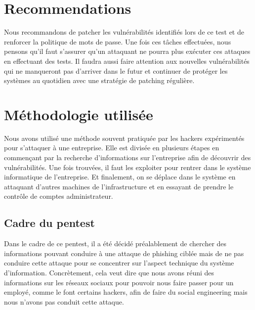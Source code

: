 \documentclass[french,oneside]{article}
\begin{document}
\section{Recommendations}

Nous recommandons de patcher les vulnérabilités identifiés lors de ce test et de renforcer la politique de mots de passe. Une fois ces tâches effectuées, nous pensons qu'il faut s'assurer qu'un attaquant ne pourra plus exécuter ces attaques en effectuant des tests. Il faudra aussi faire attention aux nouvelles vulnérabilités qui ne manqueront pas d'arriver dans le futur et continuer de protéger les systèmes au quotidien avec une stratégie de patching régulière.















\section{Méthodologie utilisée}

Nous avons utilisé une méthode souvent pratiquée par les hackers expérimentés pour s'attaquer à une entreprise. Elle est divisée en plusieurs étapes en commençant par la recherche d'informations sur l'entreprise afin de découvrir des vulnérabilités. Une fois trouvées, il faut les exploiter pour rentrer dans le système informatique de l'entreprise. Et finalement, on se déplace dans le système en attaquant d'autres machines de l'infrastructure et en essayant de prendre le contrôle de comptes administrateur.















\subsection{Cadre du pentest}

Dans le cadre de ce pentest, il a été décidé préalablement de chercher des informations pouvant conduire à une attaque de phishing ciblée mais de ne pas conduire cette attaque pour se concentrer sur l'aspect technique du système d'information. Concrètement, cela veut dire que nous avons réuni des informations sur les réseaux sociaux pour pouvoir nous faire passer pour un employé, comme le font certains hackers, afin de faire du social engineering mais nous n'avons pas conduit cette attaque.
\end{document}
